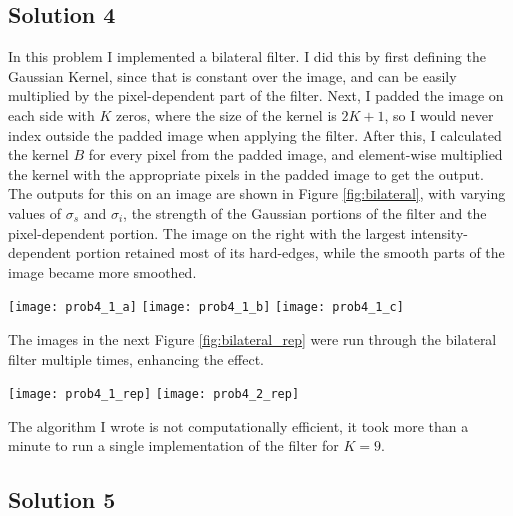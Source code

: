 \documentclass{article}
\newcommand{\solution}[1]{\clearpage \subsection*{Solution #1}}
\begin{document}
\solution{4}

In this problem I implemented a bilateral filter. I did this by first defining the Gaussian Kernel, since that is constant over the image, and can be easily multiplied by the pixel-dependent part of the filter. Next, I padded the image on each side with $K$ zeros, where the size of the kernel is $2K+1$, so I would never index outside the padded image when applying the filter. 
After this, I calculated the kernel $B$ for every pixel from the padded image, and element-wise multiplied the kernel with the appropriate pixels in the padded image to get the output. The outputs for this on an image are shown in Figure \ref{fig:bilateral}, with varying values of $\sigma_s$ and $\sigma_i$, the strength of the Gaussian portions of the filter and the pixel-dependent portion. The image on the right with the largest intensity-dependent portion retained most of its hard-edges, while the smooth parts of the image became more smoothed. 
\begin{figure*}[!h]
	\centering
	\texttt{[image: prob4\_1\_a]}
	\texttt{[image: prob4\_1\_b]}
	\texttt{[image: prob4\_1\_c]}
	\caption{Bilateral Filter, from left to right, increasing strength of pixel-dependent portion and decreasing strength of Guassian}
	\label{fig:bilateral}
\end{figure*}

The images in the next Figure \ref{fig:bilateral_rep} were run through the bilateral filter multiple times, enhancing the effect. 

\begin{figure*}[!h]
	\centering
	\texttt{[image: prob4\_1\_rep]}
	\texttt{[image: prob4\_2\_rep]}
	\caption{Bilateral Filter, Run Multiple Times}
	\label{fig:bilateral_rep}
\end{figure*}

The algorithm I wrote is not computationally efficient, it took more than a minute to run a single implementation of the filter for $K=9$.

\solution{5} 
\end{document}
